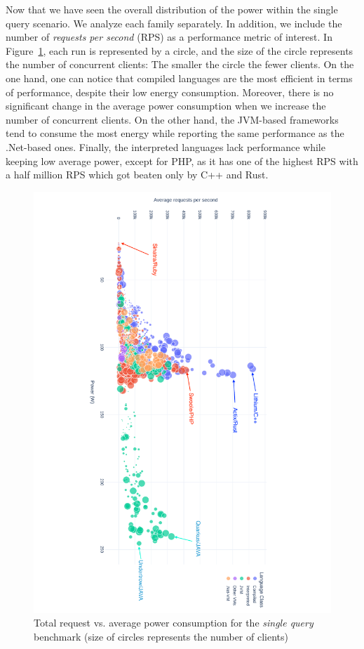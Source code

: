 Now that we have seen the overall distribution of the power within the single query scenario.
We analyze each family separately.
In addition, we include the number of \emph{requests per second} (RPS) as a performance metric of interest.
In Figure~\ref{fig:power_requests_db}, each run is represented by a circle, and the size of the circle represents the number of concurrent clients: The smaller the circle the fewer clients.
On the one hand, one can notice that compiled languages are the most efficient in terms of performance, despite their low energy consumption.
Moreover, there is no significant change in the average power consumption when we increase the number of concurrent clients.
On the other hand, the JVM-based frameworks tend to consume the most energy while reporting the same performance as the .Net-based ones.
Finally, the interpreted languages lack performance while keeping low average power, except for PHP, as it has one of the highest RPS with a half million RPS which got beaten only by C++ and Rust.

\begin{figure}[hbt]
    \includegraphics[height=\textwidth,width=\textheight,keepaspectratio,angle=90]{imgs/power_requests_db}
    \caption{Total request vs. average power consumption for the \emph{single query} benchmark (size of circles represents the number of clients)}
    \label{fig:power_requests_db}
\end{figure}

